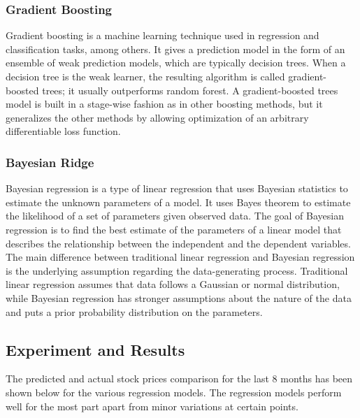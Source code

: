 \documentclass[conference]{IEEEtran}
\begin{document}
\subsubsection{Gradient Boosting}
Gradient boosting is a machine learning technique used in regression and classification tasks, among others.
It gives a prediction model in the form of an ensemble of weak prediction models, which are typically decision trees.
When a decision tree is the weak learner, the resulting algorithm is called gradient-boosted trees; it usually outperforms random forest.
A gradient-boosted trees model is built in a stage-wise fashion as in other boosting methods, but it generalizes the other methods by allowing optimization of an arbitrary differentiable loss function.

\subsubsection{Bayesian Ridge}
Bayesian regression is a type of linear regression that uses Bayesian statistics to estimate the unknown parameters of a model.
It uses Bayes theorem to estimate the likelihood of a set of parameters given observed data.
The goal of Bayesian regression is to find the best estimate of the parameters of a linear model that describes the relationship between the independent and the dependent variables.
The main difference between traditional linear regression and Bayesian regression is the underlying assumption regarding the data-generating process.
Traditional linear regression assumes that data follows a Gaussian or normal distribution, while Bayesian regression has stronger assumptions about the nature of the data and puts a prior probability distribution on the parameters.

\subsection{Experiment and Results}

The predicted and actual stock prices comparison for the last 8 months has been shown below for the various regression models.
The regression models perform well for the most part apart from minor variations at certain points.
\end{document}
